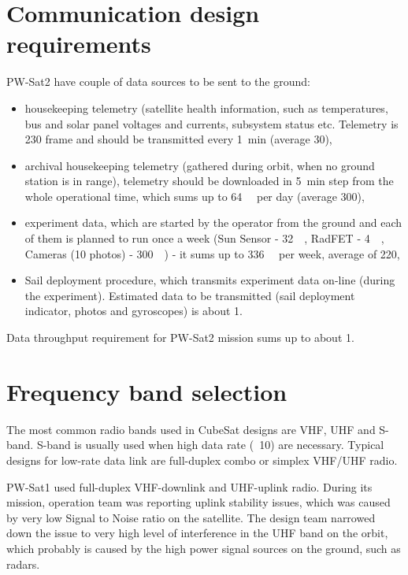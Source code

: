 \section{Communication design requirements}
PW-Sat2 have couple of data sources to be sent to the ground:
\begin{itemize}
    \item housekeeping telemetry (satellite health information, such as temperatures, bus and solar panel voltages and currents, subsystem status etc. Telemetry is \SI{230}{\byte} frame and should be transmitted every \SI{1}{\minute} (average \SI{30}{\bps}),
    \item archival housekeeping telemetry (gathered during orbit, when no ground station is in range), telemetry should be downloaded in \SI{5}{\minute} step from the whole operational time, which sums up to \SI{64}{\kilo\byte} per day (average \SI{300}{\bps}),
    \item experiment data, which are started by the operator from the ground and each of them is planned to run once a week (Sun Sensor -  \SI{32}{\kilo\byte}, RadFET - \SI{4}{\kilo\byte}, Cameras (10 photos) - \SI{300}{\kilo\byte}) - it sums up to \SI{336}{\kilo\byte} per week, average of \SI{220}{\bps},
    \item Sail deployment procedure, which transmits experiment data on-line (during the experiment). Estimated data to be transmitted (sail deployment indicator, photos and gyroscopes) is about \SI{1}{\kbps}.
\end{itemize}

Data throughput requirement for PW-Sat2 mission sums up to about \SI{1}{\kbps}.

\section{Frequency band selection}
The most common radio bands used in CubeSat designs are VHF, UHF and S-band. S-band is usually used when high data rate (~\SI{10}{\Mbps}) are necessary. Typical designs for low-rate data link are full-duplex combo or simplex VHF/UHF radio.

PW-Sat1 \cite{pwsat1_website_ska} used full-duplex VHF-downlink and UHF-uplink radio. During its mission, operation team was reporting uplink stability issues, which was caused by very low Signal to Noise ratio on the satellite. The design team narrowed down the issue to very high level of interference in the UHF band on the orbit, which probably is caused by the high power signal sources on the ground, such as radars.

